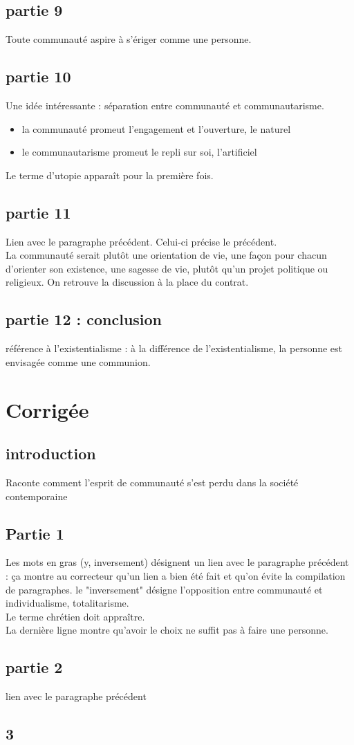 \subsection{partie 9}
Toute communauté aspire à s'ériger comme une personne.

\subsection{partie 10}
Une idée intéressante : séparation entre communauté et communautarisme.
\begin{itemize}
    \item la communauté promeut l'engagement et l'ouverture, le naturel
    \item le communautarisme promeut le repli sur soi, l'artificiel
\end{itemize}
Le terme d'utopie apparaît pour la première fois.

\subsection{partie 11}

Lien avec le paragraphe précédent. Celui-ci précise le précédent.\\
La communauté serait plutôt une orientation de vie, une façon pour chacun d'orienter son existence, une sagesse de vie, plutôt  qu'un projet politique ou religieux. On retrouve la discussion à la place du contrat.

\subsection{partie 12 : conclusion}
référence à l'existentialisme : à la différence de l'existentialisme, la personne est envisagée comme une communion.


\section{Corrigée}

\subsection{introduction}
Raconte comment l'esprit de communauté s'est perdu dans la société contemporaine

\subsection{Partie 1}
Les mots en gras (y, inversement) désignent un lien avec le paragraphe précédent : ça montre au correcteur qu'un lien a bien été fait et qu'on évite la compilation de paragraphes. le "inversement" désigne l'opposition entre communauté et individualisme, totalitarisme.\\
Le terme chrétien doit appraître.\\
La dernière ligne montre qu'avoir le choix ne suffit pas à faire une personne.

\subsection{partie 2}
lien avec le paragraphe précédent

\subsection{3}



